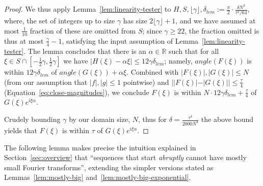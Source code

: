 \documentclass[11pt]{article}
\theoremstyle{plain}
\begin{document}
\begin{proof}
We thus apply Lemma~\ref{lem:linearity-tester}
to $H,S,\lfloor \gamma\rfloor, \delta_{lem}:=\frac{\pi}{2}\cdot\frac{\delta N^2}{\tau^3/64}$, where, the set of integers up to size $\gamma$ has size $2\lfloor\gamma\rfloor+1$, and we have assumed at most $\frac{1}{10}$ fraction of these are omitted from $S$; since $\gamma\geq 22$, the fraction omitted is thus at most $\frac{\gamma}{4}-1$, satisfying the input assumption of Lemma~\ref{lem:linearity-tester}.
The lemma concludes that there is an $\alpha\in\mathbb{R}$ such that for all $\xi\in S\cap [-\frac{1}{2}\gamma,\frac{1}{2}\gamma]$ we have $|H(\xi)- \alpha \xi|\leq 12\gamma\delta_{lem}$; namely, $angle(F(\xi))$ is within $12\gamma\delta_{lem}$ of $angle(G(\xi))+\alpha\xi$. Combined with $|F(\xi)|,|G(\xi)|\leq N$ (from our assumption that $|f|,|g|\leq 1$ pointwise) and $||F(\xi)|-|G(\xi)||\leq \frac{\tau}{4}$ (Equation~\ref{eq:close-magnitudes}), we conclude $F(\xi)$ is within $N\cdot 12\gamma\delta_{lem}+\frac{\tau}{4}$ of $G(\xi) e^{i\xi \alpha}$.

Crudely bounding $\gamma$ by our domain size, $N$, thus for $\delta=\frac{\tau^4}{2000N^4}$ the above bound yields that $F(\xi)$ is within $\tau$ of $G(\xi) e^{i\xi \alpha}$.



\end{proof}








The following lemma makes precise the intuition explained in Section~\ref{sec:overview} that ``sequences that start \textit{abruptly} cannot have mostly small Fourier transforms'', extending the simpler versions stated as Lemmas~\ref{lem:mostly-big} and~\ref{lem:mostly-big-exponential}.
\end{document}
